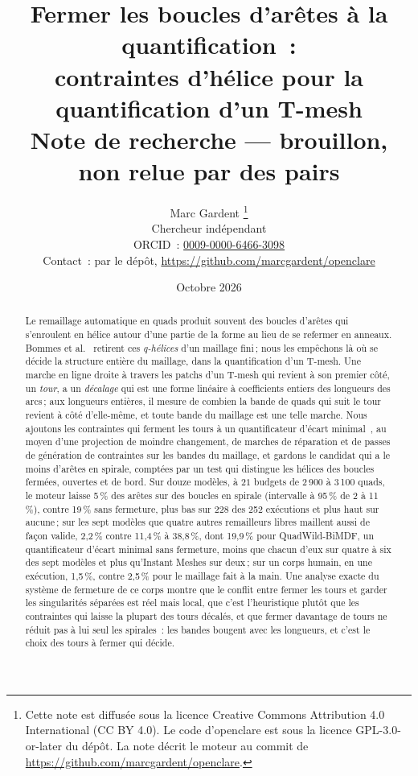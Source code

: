 \documentclass[11pt,a4paper]{article}
\title{Fermer les boucles d'arêtes à la quantification~:\\
contraintes d'hélice pour la quantification d'un T-mesh\\[0.5em]
\large Note de recherche --- brouillon, non relue par des pairs}
\author{Marc Gardent%
\thanks{Cette note est diffusée sous la licence Creative Commons Attribution
4.0 International (CC BY 4.0). Le code d'openclare est sous la licence
GPL-3.0-or-later du dépôt. La note décrit le moteur au commit
\texttt{\enginecommit} de \url{https://github.com/marcgardent/openclare}.}\\
\normalsize Chercheur indépendant\\
\normalsize ORCID~: \href{https://orcid.org/0009-0000-6466-3098}{0009-0000-6466-3098}\\
\normalsize Contact~: par le dépôt,
\url{https://github.com/marcgardent/openclare}}
\date{Octobre 2026}
\begin{document}
\maketitle

\begin{center}
\end{center}

\begin{abstract}
Le remaillage automatique en quads produit souvent des boucles d'arêtes qui
s'enroulent en hélice autour d'une partie de la forme au lieu de se refermer
en anneaux. Bommes et al.~\cite{bommes2011structure} retirent ces
\emph{q-hélices} d'un maillage fini\,; nous les empêchons là où se décide la
structure entière du maillage, dans la quantification d'un T-mesh. Une marche
en ligne droite à travers les patchs d'un T-mesh qui revient à son premier
côté, un \emph{tour}, a un \emph{décalage} qui est une forme linéaire à
coefficients entiers des longueurs des arcs\,; aux longueurs entières, il
mesure de combien la bande de quads qui suit le tour revient à côté
d'elle-même, et toute bande du maillage est une telle marche. Nous ajoutons
les contraintes qui ferment les tours à un quantificateur d'écart
minimal~\cite{heistermann2023bimdf}, au moyen d'une projection de moindre
changement, de marches de réparation et de passes de génération de
contraintes sur les bandes du maillage, et gardons le candidat qui a le moins
d'arêtes en spirale, comptées par un test qui distingue les hélices des
boucles fermées, ouvertes et de bord. Sur douze modèles, à $21$ budgets de
2\,900 à 3\,100 quads, le moteur laisse 5\,\% des arêtes sur des boucles en
spirale (intervalle à 95\,\% de 2 à 11\,\%), contre 19\,\% sans fermeture,
plus bas sur 228 des 252 exécutions et plus haut sur aucune\,; sur les sept
modèles que quatre autres remailleurs libres maillent aussi de façon valide,
2,2\,\% contre 11,4\,\% à 38,8\,\%, dont 19,9\,\% pour QuadWild-BiMDF, un
quantificateur d'écart minimal sans fermeture, moins que chacun d'eux sur
quatre à six des sept modèles et plus qu'Instant Meshes sur deux\,; sur un
corps humain, en une exécution, 1,5\,\%, contre 2,5\,\% pour le maillage
fait à la main. Une analyse exacte du système de fermeture de ce
corps montre que le conflit entre fermer les tours et garder les
singularités séparées est réel mais local, que c'est l'heuristique plutôt
que les contraintes qui laisse la plupart des tours décalés, et que fermer
davantage de tours ne réduit pas à lui seul les spirales~: les bandes
bougent avec les longueurs, et c'est le choix des tours à fermer qui décide.
\end{abstract}
\end{document}
